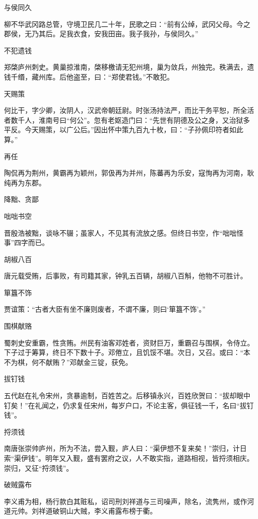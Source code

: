 \documentclass[a4paper,12pt,UTF8,twoside]{ctexbook}
\begin{document}
    与侯同久
    
    柳不华武冈路总管，守境卫民几二十年，民歌之曰：“前有公绰，武冈父母。今之郡侯，无乃其后。足我衣食，安我田亩。我子我孙，与侯同久。”
    
    不犯遗钱
    
    郑棨庐州刺史。黄巢掠淮南，棨移檄请无犯州境，巢为敛兵，州独完。秩满去，遗钱千缗，藏州库。后他盗至，曰：“郑使君钱。”不敢犯。
    
    天赐策
    
    何比干，字少卿，汝阴人，汉武帝朝廷尉。时张汤持法严，而比干务平恕，所全活者数千人，淮南号曰“何公”。忽有老妪造门曰：“先世有阴德及公之身，又治狱多平反。今天赐策，以广公后。”因出怀中策九百九十枚，曰：“子孙佩印符者如此算。”
    
    再任
    
    陶侃再为荆州，黄霸再为颖州，郭伋再为并州，陈蕃再为乐安，寇恂再为河南，耿纯再为东郡。
    
    降黜、贪鄙
    
    咄咄书空
    
    晋殷浩被黜，谈咏不辍；虽家人，不见其有流放之感。但终日书空，作“咄咄怪事”四字而已。
    
    胡椒八百
    
    唐元载受贿，后事败，有司籍其家，钟乳五百辆，胡椒八百斛，他物不可胜计。
    
    箪簋不饰
    
    贾谊策：“古者大臣有坐不廉则废者，不谓不廉，则曰‘箪簋不饰’。”
    
    围棋献赂
    
    蜀刺史安重霸，性贪贿。州民有油客邓姓者，资财巨万，重霸召与围棋，令侍立。下子过于筹算，终日不下数十子。邓倦立，且饥馁不堪。次日，又召。或曰：“本不为棋，何不献贿？”邓献金三锭，获免。
    
    拔钉钱
    
    五代赵在礼令宋州，贪暴逾制，百姓苦之。后移镇永兴，百姓欣贺曰：“拔却眼中钉矣！”在礼闻之，仍求复任宋州，每岁户口，不论主客，俱征钱一千，名曰“拔钉钱”。
    
    捋须钱
    
    南唐张崇帅庐州，所为不法，尝入觐，庐人曰：“渠伊想不复来矣！”崇归，计日索“渠伊钱”。明年又入觐，盛有罢府之议，人不敢实指，道路相视，皆捋须相庆。崇归，又征“捋须钱”。
    
    破贼露布
    
    李义甫为相，杨行款白其赃私，诏司刑刘祥道与三司噪声，除名，流隽州，或作河道元帅。刘祥道破铜山大贼，李义甫露布榜于衢。
    
\end{document}

